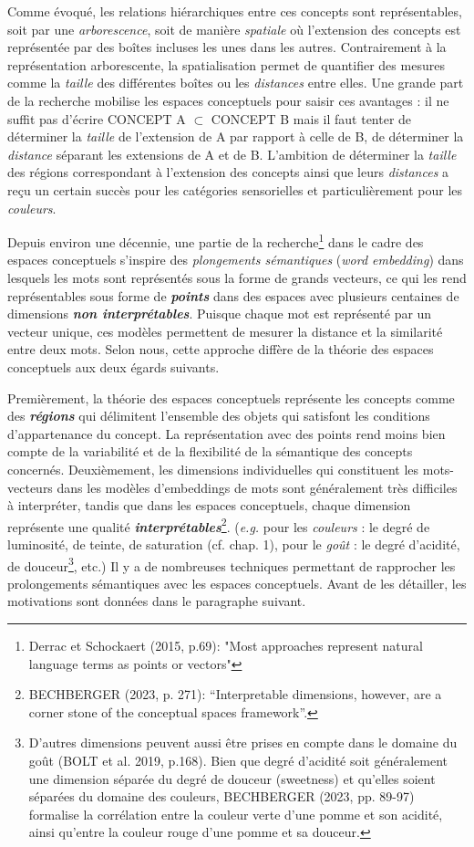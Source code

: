 \documentclass{article}
\newcommand{\bolditalic}[1]{\textbf{\textit{#1}}}
\begin{document}
Comme évoqué, les relations hiérarchiques entre ces concepts sont représentables, soit par une \textit{arborescence}, soit de manière \textit{spatiale} où l'extension des concepts est représentée par des boîtes incluses les unes dans les autres. Contrairement à la représentation arborescente, la spatialisation permet de quantifier des mesures comme la \textit{taille} des différentes boîtes ou les \textit{distances} entre elles. Une grande part de la recherche mobilise les espaces conceptuels pour saisir ces avantages : il ne suffit pas d'écrire \og CONCEPT A $\subset$ CONCEPT B \fg mais il faut tenter de déterminer la \textit{taille} de l'extension de A par rapport à celle de B, de déterminer la \textit{distance} séparant les extensions de A et de B. L'ambition de déterminer la \textit{taille} des régions correspondant à l'extension des concepts ainsi que leurs \textit{distances} a reçu un certain succès pour les catégories sensorielles et particulièrement pour les \textit{couleurs}.
\par
Depuis environ une décennie, une partie de la recherche\footnote{Derrac et Schockaert (2015, p.69): "Most approaches represent natural language terms as points or vectors"} dans le cadre des espaces conceptuels s'inspire des \textit{plongements sémantiques} (\textit{word embedding}) dans lesquels les mots sont représentés sous la forme de grands vecteurs, ce qui les rend représentables sous forme de \bolditalic{points} dans des espaces avec plusieurs centaines de dimensions \bolditalic{non interprétables}. Puisque chaque mot est représenté par un vecteur unique, ces modèles permettent de mesurer la distance et la similarité entre deux mots. Selon nous, cette approche diffère de la théorie des espaces conceptuels aux deux égards suivants.
\par
Premièrement, la théorie des espaces conceptuels représente les concepts comme des \bolditalic{régions} qui délimitent l'ensemble des objets qui satisfont les conditions d'appartenance du concept. La représentation avec des points rend moins bien compte de la variabilité et de la flexibilité de la sémantique des concepts concernés. Deuxièmement, les dimensions individuelles qui constituent les mots-vecteurs dans les modèles d’embeddings de mots sont généralement très difficiles à interpréter, tandis que dans les espaces conceptuels, chaque dimension représente une qualité \bolditalic{interprétables}\footnote{BECHBERGER (2023, p. 271): “Interpretable dimensions, however, are a corner stone of the conceptual spaces framework”.}. (\textit{e.g.} pour les \textit{couleurs} : le degré de luminosité, de teinte, de saturation (cf. chap. 1), pour le \textit{goût} : le degré d’acidité, de douceur\footnote{D’autres dimensions peuvent aussi être prises en compte dans le domaine du goût (BOLT et al. 2019, p.168). Bien que degré d'acidité soit généralement une dimension séparée du degré de douceur (sweetness) et qu'elles soient séparées du domaine des couleurs, BECHBERGER (2023, pp. 89-97) formalise la corrélation entre la couleur verte d'une pomme et son acidité, ainsi qu’entre la couleur rouge d'une pomme et sa douceur.}, etc.) Il y a de nombreuses techniques permettant de rapprocher les prolongements sémantiques  avec les espaces conceptuels. Avant de les détailler, les motivations sont données dans le paragraphe suivant.
\end{document}
